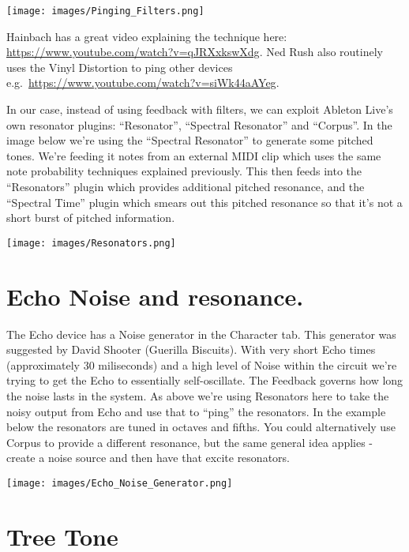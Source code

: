 \documentclass[
  12pt,
  letterpaper,
  oneside,
  open=any]{scrbook}
\begin{document}
\texttt{[image: images/Pinging\_Filters.png]}

Hainbach has a great video explaining the technique here:
\url{https://www.youtube.com/watch?v=qJRXxkswXdg}. Ned Rush also
routinely uses the Vinyl Distortion to ping other devices
e.g.~\url{https://www.youtube.com/watch?v=siWk44aAYeg}.

In our case, instead of using feedback with filters, we can exploit
Ableton Live's own resonator plugins: ``Resonator'', ``Spectral
Resonator'' and ``Corpus''. In the image below we're using the
``Spectral Resonator'' to generate some pitched tones. We're feeding it
notes from an external MIDI clip which uses the same note probability
techniques explained previously. This then feeds into the ``Resonators''
plugin which provides additional pitched resonance, and the ``Spectral
Time'' plugin which smears out this pitched resonance so that it's not a
short burst of pitched information.

\texttt{[image: images/Resonators.png]}

\section{Echo Noise and resonance.}\label{echo-noise-and-resonance.}

The Echo device has a Noise generator in the Character tab. This
generator was suggested by David Shooter (Guerilla Biscuits). With very
short Echo times (approximately 30 miliseconds) and a high level of
Noise within the circuit we're trying to get the Echo to essentially
self-oscillate. The Feedback governs how long the noise lasts in the
system. As above we're using Resonators here to take the noisy output
from Echo and use that to ``ping'' the resonators. In the example below
the resonators are tuned in octaves and fifths. You could alternatively
use Corpus to provide a different resonance, but the same general idea
applies - create a noise source and then have that excite resonators.

\texttt{[image: images/Echo\_Noise\_Generator.png]}

\section{Tree Tone}\label{tree-tone}
\end{document}
